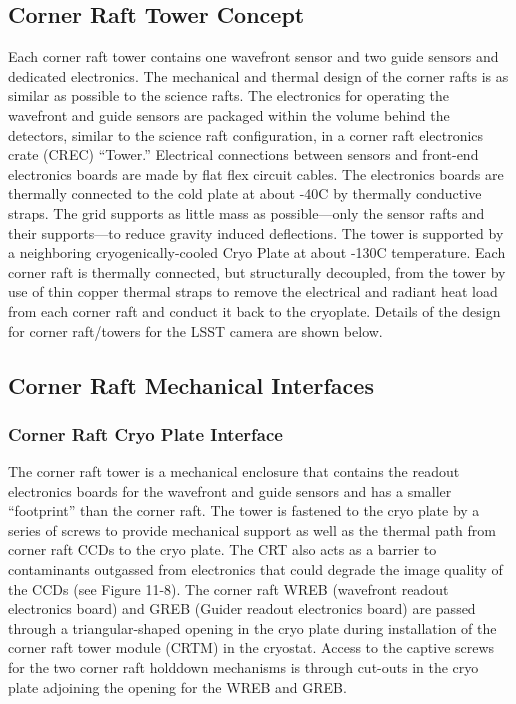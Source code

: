 \subsection{Corner Raft Tower Concept}

Each corner raft tower contains one wavefront sensor and two guide sensors and dedicated electronics.
The mechanical and thermal design of the corner rafts is as similar as possible to the science rafts.
The electronics for operating the wavefront and guide sensors are packaged within the volume behind
the detectors, similar to the science raft configuration, in a corner raft electronics crate (CREC) “Tower.”
Electrical connections between sensors and front-end electronics boards are made by flat flex circuit
cables. The electronics boards are thermally connected to the cold plate at about -40C by thermally
conductive straps. The grid supports as little mass as possible—only the sensor rafts and their
supports—to reduce gravity induced deflections. The tower is supported by a neighboring cryogenically-cooled
Cryo Plate at about -130C temperature. Each corner raft is thermally connected, but structurally
decoupled, from the tower by use of thin copper thermal straps to remove the electrical and radiant
heat load from each corner raft and conduct it back to the cryoplate. Details of the design for corner
raft/towers for the LSST camera are shown below.

\subsection{Corner Raft Mechanical Interfaces}

\subsubsection{Corner Raft Cryo Plate Interface}

The corner raft tower is a mechanical enclosure that contains the readout electronics boards for the
wavefront and guide sensors and has a smaller “footprint” than the corner raft. The tower is fastened
to the cryo plate by a series of screws to provide mechanical support as well as the thermal path from
corner raft CCDs to the cryo plate. The CRT also acts as a barrier to contaminants outgassed from
electronics that could degrade the image quality of the CCDs (see Figure 11-8).
The corner raft WREB (wavefront readout electronics board) and GREB (Guider readout electronics
board) are passed through a triangular-shaped opening in the cryo plate during installation of the corner
raft tower module (CRTM) in the cryostat. Access to the captive screws for the two corner raft holddown
mechanisms is through cut-outs in the cryo plate adjoining the opening for the WREB and GREB.

